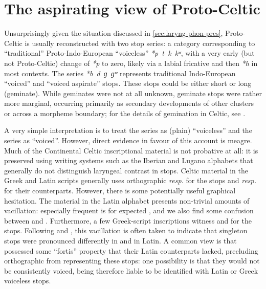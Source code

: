 \documentclass[output=paper,colorlinks,citecolor=brown]{langscibook}
\begin{document}
\section{The aspirating view of Proto-Celtic}
\label{sec:aspir-view-proto}

Unsurprisingly given the situation discussed in \cref{sec:laryng-phon-pres}, Proto\hyp Celtic is usually reconstructed with two stop series: a  category corresponding to \enquote{traditional} Proto\hyp Indo\hyp European \enquote{voiceless} \textit{*p~t~k~kʷ}, with a very early (but not Proto\hyp Celtic) change of \textit{*p} to zero, likely via a labial fricative and then \textit{*h} in most contexts. The  series \textit{*b~d~ɡ~ɡʷ} represents traditional Indo\hyp European \enquote{voiced} and \enquote{voiced aspirate} stops. These stops could be either short or long (geminate). While  geminates were not at all unknown,  geminate stops were rather more marginal, occurring primarily as secondary developments of other clusters or across a morpheme boundary; for the details of gemination in Celtic, see \textcite{stifter2023celtic}.

A very simple interpretation is to treat the  series as (plain) \enquote{voiceless} and the  series as \enquote{voiced}. However, direct evidence in favour of this account is meagre. Much of the Continental Celtic inscriptional material is not probative at all: it is preserved using writing systems such as the Iberian and Lugano alphabets that generally do not distinguish laryngeal contrast in stops. Celtic material in the Greek and Latin scripts generally uses orthographic  \emph{resp.}  for the  stops and  \emph{resp.}  for their  counterparts. However, there is some potentially useful graphical hesitation. The  material in the Latin alphabet presents non\hyp trivial amounts of vacillation: especially frequent is  for expected \ipa{[ɡ]}, and we also find some confusion between  and . Furthermore, a few Greek\hyp script inscriptions witness  and  for the  stops. Following \citet{gray1944mutation} and \citet{Watkins1955}, this vacillation is often taken to indicate that singleton stops were pronounced differently in  and in Latin. A common view is that   possessed some \enquote{fortis} property that their Latin counterparts lacked, precluding orthographic  from representing these  stops: one possibility is that they would not be consistently voiced, being therefore liable to be identified with Latin or Greek voiceless stops.
\end{document}
